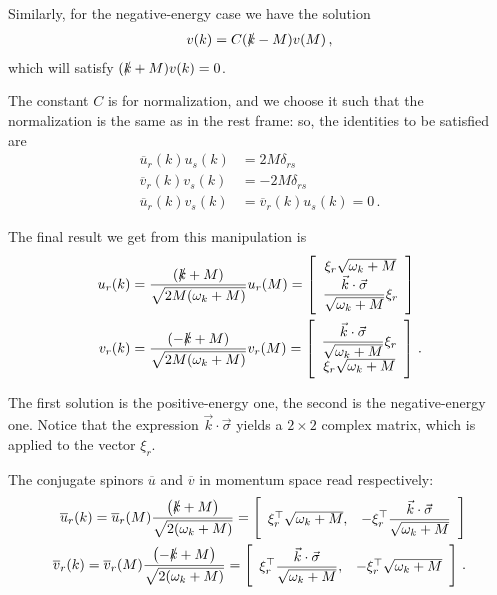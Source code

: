 \documentclass[main.tex]{subfiles}
\begin{document}
Similarly, for the negative-energy case we have the solution 
%
\begin{align}
v(k) = C (\slashed{k} - M )v(M)
\,,
\end{align}
%
which will satisfy \((\slashed{k} + M) v(k) = 0\).

The constant \(C\) is for normalization, and we choose it such that the normalization is the same as in the rest frame: so, the identities to be satisfied are 
%
\begin{align} \label{eq:normalization-spinor}
\overline{u}_{r} (k) u_{s}(k) &= 2 M \delta_{rs}  \\
\overline{v}_{r} (k) v_{s}(k) &= - 2 M \delta_{rs}  \\
\overline{u}_{r} (k) v_{s}(k) &=   
\overline{v}_{r} (k) u_{s}(k) = 0  
\,.
\end{align}

The final result we get from this manipulation is 
%
\begin{align}
u_r (k) &= \frac{(\slashed{k} + M)}{\sqrt{2 M \qty(\omega_{k} + M )}} u_r (M)
= \left[\begin{array}{c}
\xi_{r}\sqrt{\omega_{k} + M} \\ 
\displaystyle
\frac{\vec{k} \cdot \vec{\sigma}}{\sqrt{\omega_{k} + M}} 
\xi_{r}
\end{array}\right] \\
v_r (k) &= \frac{(-\slashed{k} + M)}{\sqrt{2 M \qty(\omega_{k} + M )}} v_r (M)
= \left[\begin{array}{c}
\displaystyle
\frac{\vec{k} \cdot \vec{\sigma}}{\sqrt{\omega_{k} + M}} \xi_{r}\\
\xi_{r}\sqrt{\omega_{k} + M} 
\end{array}\right]
\,.
\end{align}

The first solution is the positive-energy one, the second is the negative-energy one. 
Notice that the expression \(\vec{k} \cdot \vec{\sigma}\) yields a \(2 \times 2\) complex matrix, which is applied to the vector \(\xi_{r}\).

\begin{claim}
The conjugate spinors \(\overline{u}\) and \(\overline{v}\) in momentum space read respectively: 
%
\begin{align}
\overline{u}_{r} (k) = \overline{u}_{r}(M) \frac{\qty(\slashed{k} + M)}{\sqrt{2 (\omega_{k} + M)}}
= \left[\begin{array}{cc}
\xi_{r}^{\top} \sqrt{\omega_{k} + M}, & 
\displaystyle
- \xi_{r}^{\top} \frac{\vec{k} \cdot \vec{\sigma}}{\sqrt{\omega_{k} + M}}
\end{array}\right] \\
\overline{v}_{r} (k) = \overline{v}_{r}(M) \frac{\qty(-\slashed{k} + M)}{\sqrt{2 (\omega_{k} + M)}}
= \left[\begin{array}{cc}
\displaystyle
\xi_{r}^{\top} \frac{\vec{k} \cdot \vec{\sigma}}{\sqrt{\omega_{k} + M}}, &
-\xi_{r}^{\top} \sqrt{\omega_{k} + M}
\end{array}\right]
\,.
\end{align}
\end{claim}
\end{document}
